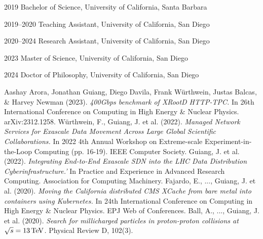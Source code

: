 \begin{vita}
\noindent
\begin{cv}{}
\begin{cvlist}{}
\item[2019] Bachelor of Science, University of California, Santa Barbara
\item[2019--2020] Teaching Assistant, University of California, San Diego
\item[2020--2024] Research Assistant, University of California, San Diego
\item[2023] Master of Science, University of California, San Diego
\item[2024] Doctor of Philosophy, University of California, San Diego
\end{cvlist}
\end{cv}

\publications
\noindent Aashay Arora, Jonathan Guiang, Diego Davila, Frank Würthwein, Justas Balcas, \& Harvey Newman (2023). 
\textit{400Gbps benchmark of XRootD HTTP-TPC.}
In 26th International Conference on Computing in High Energy \& Nuclear Physics. arXiv:2312.1258.
\newline
\newline
\noindent W\"urthwein, F., Guiang, J. et al. (2022). 
\textit{Managed Network Services for Exascale Data Movement Across Large Global Scientific Collaborations.}
In 2022 4th Annual Workshop on Extreme-scale Experiment-in-the-Loop Computing (pp. 16-19). IEEE Computer Society.
\newline
\newline
\noindent Guiang, J. et al. (2022). 
\textit{Integrating End-to-End Exascale SDN into the LHC Data Distribution Cyberinfrastructure.'}
In Practice and Experience in Advanced Research Computing. Association for Computing Machinery.
\newline
\newline
\noindent Fajardo, E., ..., Guiang, J. et al. (2020). 
\textit{Moving the California distributed CMS XCache from bare metal into containers using Kubernetes.}
In 24th International Conference on Computing in High Energy \& Nuclear Physics. EPJ Web of Conferences.
\newline
\newline
\noindent Ball, A., ..., Guiang, J. et al. (2020). 
\textit{Search for millicharged particles in proton-proton collisions at $\sqrt{s} = 13 \,\text{Te\hspace{-.08em}V}$.}
Physical Review D, 102(3).
\end{vita}
